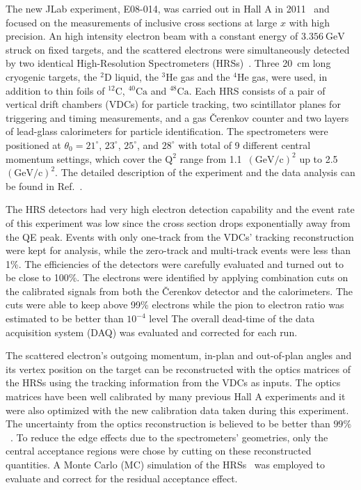 
The new JLab experiment, E08-014, was carried out in Hall A in 2011~\cite{e08014_pr} and focused on the measurements of inclusive cross sections at
large $x$ with high precision. An high intensity electron beam with a constant energy of $3.356~\mathrm{GeV}$ struck on fixed targets, and the
scattered electrons were simultaneously detected by two identical High-Resolution Spectrometers (HRSs)~\cite{halla_nim}. Three 20~cm long cryogenic
targets, the $\mathrm{^{2}D}$ liquid, the $\mathrm{^{3}He}$ gas and the $\mathrm{^{4}He}$ gas, were used, in addition to thin foils of $\mathrm{^{12}C}$,
$\mathrm{^{40}Ca}$ and $\mathrm{^{48}Ca}$. Each HRS consists of a pair of vertical drift chambers (VDCs) for particle tracking, two scintillator planes
for triggering and timing measurements, and a gas \v{C}erenkov counter and two layers of lead-glass calorimeters for particle identification. The
spectrometers were positioned at $\theta_{0}=21^\circ$, $23^\circ$, $25^\circ$, and $28^\circ$ with total of 9 different central momentum settings, which
cover the $\mathrm{Q^{2}}$ range from 1.1~$\mathrm{(GeV/c)^{2}}$ up to 2.5~$\mathrm{(GeV/c)^{2}}$. The detailed description of the experiment and the
data analysis can be found in Ref.~\cite{zye_thesis}.

 The HRS detectors had very high electron detection capability and the event rate of this experiment was low since the cross section drops exponentially
 away from the QE peak. Events with only one-track from the VDCs' tracking reconstruction were kept for analysis, while the zero-track and multi-track
 events were less than 1\%. The efficiencies of the detectors were carefully evaluated and turned out to be close to 100\%. The electrons were
 identified by applying combination cuts on the calibrated signals from both the \v{C}erenkov detector and the calorimeters. The cuts were able to keep
 above 99\% electrons while the pion to electron ratio was estimated to be better than $\mathrm{10^{-4}}$ level %
 The overall dead-time of the data acquisition system (DAQ) was evaluated and corrected for each run.

The scattered electron's outgoing momentum, in-plan and out-of-plan angles and its vertex position on the target can be reconstructed with the optics matrices of the HRSs using the tracking information from the VDCs as inputs. The optics matrices have been well calibrated by many previous Hall A experiments and it were also optimized with the new calibration data taken during this experiment. The uncertainty from the optics reconstruction is believed to be better than $99\%$~\cite{halla_nim}. To reduce the edge effects due to the spectrometers' geometries, only the central acceptance regions were chose by cutting on these reconstructed quantities. A Monte Carlo (MC) simulation of the HRSs~\cite{zye_thesis} was employed to evaluate and correct for the residual acceptance effect. 

